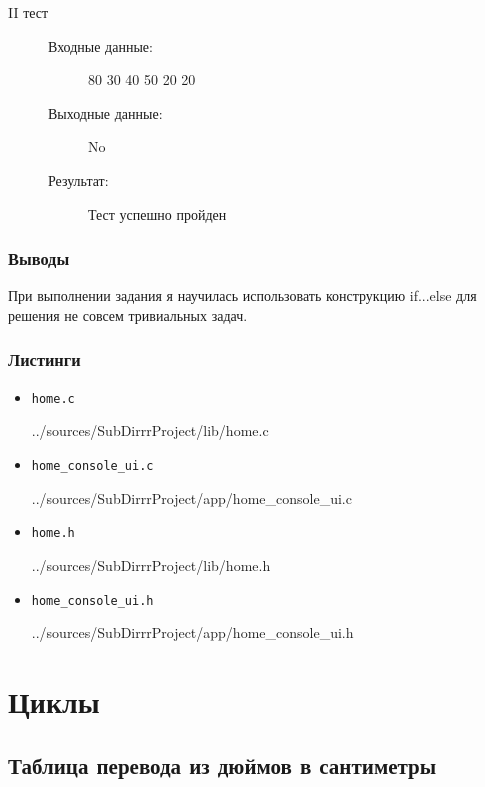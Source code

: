 \documentclass[12pt,a4paper]{report}
\begin{document}
\begin{enumerate}
\begin{description}
\item[II тест]
\hspace{\parindent}
\begin{flushleft}
\begin{description}
\item[Входные данные:] 80 30 40 50 20 20 
\item[Выходные данные:] No
\item[Результат:] Тест успешно пройден
\end{description}
\end{flushleft}
\end{description}

\end{enumerate}

\subsection{Выводы}
\hspace{\parindent} 
При выполнении задания я научилась использовать конструкцию if...else для решения не совсем тривиальных задач.
\subsection*{Листинги}
\begin{itemize}
\item[] \verb-home.c-

{../sources/SubDirrrProject/lib/home.c}
\item[] \verb-home_console_ui.c-

{../sources/SubDirrrProject/app/home_console_ui.c}
\item[] \verb-home.h-

{../sources/SubDirrrProject/lib/home.h}
\item[] \verb-home_console_ui.h-

{../sources/SubDirrrProject/app/home_console_ui.h}
\end{itemize}
%
\chapter{Циклы}
\section{Таблица перевода из дюймов в сантиметры}
\end{document}
